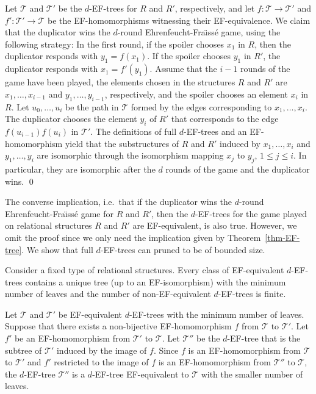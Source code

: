 \documentclass{CSML}
\newcommand{\TT}{\mathcal{T}}
\theoremstyle{plain}\newtheorem{claim}[thm]{Claim}
\begin{document}
\proof
Let $\TT$ and $\TT'$ be the $d$-EF-trees for $R$ and $R'$, respectively, and
let $f:\TT\to\TT'$ and $f':\TT'\to\TT$ be the EF-homomorphisms witnessing their EF-equivalence. We claim
that the duplicator wins the $d$-round Ehrenfeucht-Fra{\"\i}ss\'e game, using the following strategy:
In the first round, if the spoiler chooses $x_1$ in $R$,
then the duplicator responds with $y_1=f(x_1)$.
If the spoiler chooses $y_1$ in $R'$, the duplicator responds with $x_1=f'(y_1)$.
Assume that the $i-1$ rounds of the game have been played,
the elements chosen in the structures $R$ and $R'$ are $x_1,\ldots,x_{i-1}$ and $y_1,\ldots,y_{i-1}$, respectively, and
the spoiler chooses an element $x_i$ in $R$.
Let $u_0,\ldots,u_i$ be the path in $\TT$ formed by the edges corresponding to $x_1,\ldots,x_i$.
The duplicator chooses the element $y_i$ of $R'$ that corresponds to the edge $f(u_{i-1})f(u_i)$ in $\TT'$.
The definitions of full $d$-EF-trees and an EF-homomorphism yield that
the substructures of $R$ and $R'$ induced by $x_1,\ldots,x_i$ and $y_1,\ldots,y_i$ are isomorphic
through the isomorphism mapping $x_j$ to $y_j$, $1\le j\le i$.
In particular, they are isomorphic after the $d$ rounds of the game and
the duplicator wins.
\qed

The converse implication, i.e.~that if the duplicator wins the $d$-round Ehren\-feucht-Fra{\"\i}ss\'e game for $R$ and $R'$,
then the $d$-EF-trees for the game played on relational structures $R$ and $R'$ are EF-equivalent, is also true.
However, we omit the proof since we only need the implication given by Theorem~\ref{thm-EF-tree}.
We show that full $d$-EF-trees can pruned to be of bounded size.

\begin{lem}
\label{lem:prune}
Consider a fixed type of relational structures.
Every class of EF-equivalent $d$-EF-trees contains a unique tree (up to an EF-isomorphism) with the minimum number of leaves and
the number of non-EF-equivalent $d$-EF-trees is finite.
\end{lem}

\proof
Let $\TT$ and $\TT'$ be EF-equivalent $d$-EF-trees with the minimum number of leaves.
Suppose that there exists a non-bijective EF-homomorphism $f$ from $\TT$ to $\TT'$.
Let $f'$ be an EF-homomorphism from $\TT'$ to $\TT$.
Let $\TT''$ be the $d$-EF-tree that is the subtree of $\TT'$ induced by the image of $f$.
Since $f$ is an EF-homomorphism from $\TT$ to $\TT'$ and
$f'$ restricted to the image of $f$ is an EF-homomorphism from $\TT''$ to $\TT$,
the $d$-EF-tree $\TT''$ is a $d$-EF-tree EF-equivalent to $\TT$ with the smaller number of leaves.
\end{document}

